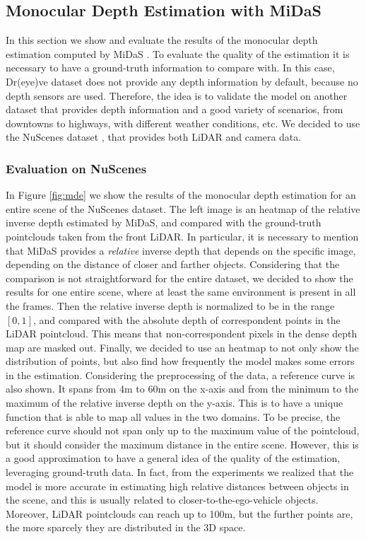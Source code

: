 \subsection{Monocular Depth Estimation with MiDaS}
In this section we show and evaluate the results of the monocular depth estimation 
computed by MiDaS \cite{midas}. To evaluate the quality of the estimation it 
is necessary to have a ground-truth information to compare with. In this case, 
Dr(eye)ve dataset does not provide any depth information by default, because no 
depth sensors are used. 
Therefore, the idea is to validate the model on another 
dataset that provides depth information and a good variety of scenarios, from 
downtowns to highways, with different weather conditions, etc. 
We decided to use the NuScenes dataset \cite{nuscenes}, that provides both 
LiDAR and camera data.

\subsubsection*{Evaluation on NuScenes}
In Figure \ref{fig:mde} we show the results of the monocular depth estimation 
for an entire scene of the NuScenes dataset. The left image is an heatmap of 
the relative inverse depth estimated by MiDaS, and compared with the ground-truth 
pointclouds taken from the front LiDAR. In particular, it is necessary to mention 
that MiDaS provides a \emph{relative} inverse depth that depends on the specific 
image, depending on the distance of closer and farther objects.
Considering that the comparison is not straightforward for the entire dataset, 
we decided to show the results for one entire scene, where at least the same 
environment is present in all the frames. Then the relative inverse depth is 
normalized to be in the range $[0, 1]$, and compared with the absolute depth 
of correspondent points in the LiDAR pointcloud. This means that non-correspondent 
pixels in the dense depth map are masked out.
Finally, we decided to use an heatmap to not only show the distribution of points, 
but also find how frequently the model makes some errors in the estimation.
Considering the preprocessing of the data, a reference curve is also shown. 
It spans from 4m to 60m on the x-axis and from the 
minimum to the maximum of the relative inverse depth on the y-axis. This is to have 
a unique function that is able to map all values in the two domains.
To be precise, the reference curve should not span only up to the maximum 
value of the pointcloud, but it should consider the maximum distance in the 
entire scene. However, this is a good approximation to have a general idea 
of the quality of the estimation, leveraging ground-truth data. In fact, 
from the experiments we realized that the model is more accurate in estimating 
high relative distances between objects in the scene, and this is usually related 
to closer-to-the-ego-vehicle objects. Moreover, LiDAR pointclouds can reach 
up to 100m, but the further points are, the more sparcely they are distributed
in the 3D space.

